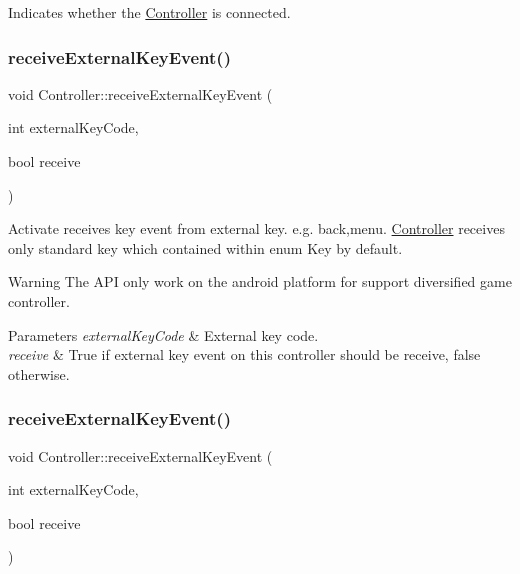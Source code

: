 Indicates whether the \hyperlink{classController}{Controller} is connected. \mbox{\label{classController_a196df7e52d96b0094f7b27adc5cd4077}} 
\subsubsection{\texorpdfstring{receive\+External\+Key\+Event()}{receiveExternalKeyEvent()}\hspace{0.1cm}{\footnotesize\ttfamily [1/2]}}
{\footnotesize\ttfamily void Controller\+::receive\+External\+Key\+Event (\begin{DoxyParamCaption}\item[{int}]{external\+Key\+Code,  }\item[{bool}]{receive }\end{DoxyParamCaption})}

Activate receives key event from external key. e.\+g. back,menu. \hyperlink{classController}{Controller} receives only standard key which contained within enum Key by default.

\begin{DoxyWarning}{Warning}
The A\+PI only work on the android platform for support diversified game controller.
\end{DoxyWarning}

\begin{DoxyParams}{Parameters}
{\em external\+Key\+Code} & External key code. \\
\hline
{\em receive} & True if external key event on this controller should be receive, false otherwise. \\
\hline
\end{DoxyParams}
\mbox{\label{classController_a196df7e52d96b0094f7b27adc5cd4077}} 
\subsubsection{\texorpdfstring{receive\+External\+Key\+Event()}{receiveExternalKeyEvent()}\hspace{0.1cm}{\footnotesize\ttfamily [2/2]}}
{\footnotesize\ttfamily void Controller\+::receive\+External\+Key\+Event (\begin{DoxyParamCaption}\item[{int}]{external\+Key\+Code,  }\item[{bool}]{receive }\end{DoxyParamCaption})}

